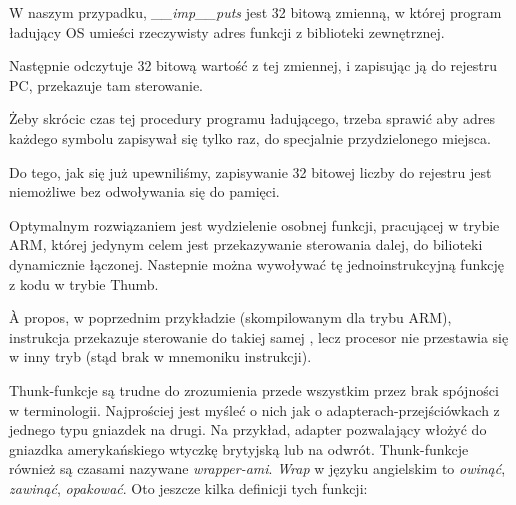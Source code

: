 W naszym przypadku, \emph{\_\_imp\_\_puts} jest 32 bitową zmienną, w której program ładujący \ac{OS} umieści rzeczywisty adres funkcji z biblioteki zewnętrznej.

Następnie  odczytuje 32 bitową wartość z tej zmiennej, i zapisując ją do rejestru \ac{PC}, przekazuje tam sterowanie.

Żeby skrócic czas tej procedury programu ładującego, trzeba sprawić aby adres każdego symbolu zapisywał się tylko raz, do specjalnie przydzielonego miejsca.

Do tego, jak się już upewniliśmy, zapisywanie 32 bitowej liczby do rejestru jest niemożliwe bez odwoływania się do pamięci.

Optymalnym rozwiązaniem jest wydzielenie osobnej funkcji, pracującej w trybie ARM,
której jedynym celem jest przekazywanie sterowania dalej, do bilioteki dynamicznie łączonej. Nastepnie można wywoływać tę jednoinstrukcyjną funkcję z kodu w trybie Thumb.

À propos, w poprzednim przykładzie (skompilowanym dla trybu ARM), instrukcja  przekazuje sterowanie do takiej samej , lecz procesor nie przestawia się w inny tryb (stąd brak  w mnemoniku instrukcji).


Thunk-funkcje są trudne do zrozumienia przede wszystkim przez brak spójności w terminologii.
Najprościej jest myśleć o nich jak o adapterach-przejściówkach z jednego typu gniazdek na drugi.
Na przykład, adapter pozwalający włożyć do gniazdka amerykańskiego wtyczkę brytyjską lub na odwrót. Thunk-funkcje również są czasami nazywane \emph{wrapper-ami}. \emph{Wrap} w języku angielskim to \emph{owinąć}, \emph{zawinąć}, \emph{opakować}.
Oto jeszcze kilka definicji tych funkcji:

